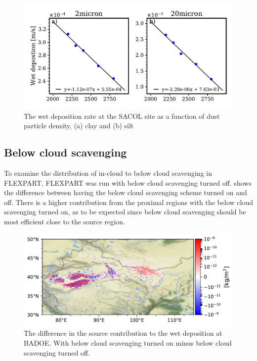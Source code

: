 \begin{figure}[hptb]
    \centering
    \includegraphics[width=\textwidth]{texfiles/figs/wetdep_function_of_density.pdf}
    \caption{The wet deposition rate at the SACOL site as a function of dust particle density, (a) clay and (b) silt}
    \label{fig:wet_dep_density}
\end{figure}

\subsection{Below cloud scavenging}\label{wet:dep_sensitivty}
To examine the distribution of in-cloud to below cloud scavenging in FLEXPART, FLEXPART was run with below cloud scavenging turned off. 
 shows the difference between having the below cloud scavenging scheme turned on and off. 
There is a higher contribution from the proximal regions with the below cloud scavenging turned on, as to be expected since below cloud scavenging should be most efficient close to the source region.  
\begin{figure}[htbp]
    \centering
    \includegraphics[width=\textwidth]{texfiles/figs/no_scav_test.pdf}
    \caption{The difference in the source contribution to the wet deposition at BADOE. With below cloud scavenging turned on minus below cloud scavenging turned off.}
    \label{fig:scav_sensitivty}
\end{figure}

